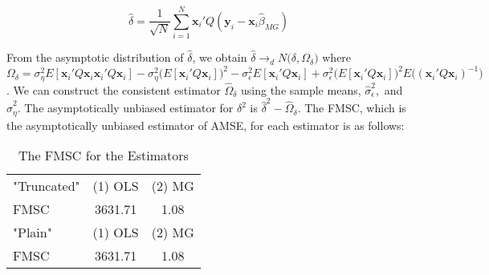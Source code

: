 \[
\widehat{\delta} = \frac{1}{\sqrt{N}} \sum_{i=1}^N \mathbf{x}_i'Q(\mathbf{y}_i - \mathbf{x}_i \widehat{\beta}_{MG})
\]

From the asymptotic distribution of $\widehat{\delta}$, we obtain $\widehat{\delta} \rightarrow_d N\big(\delta , \Omega_\delta\big)$ where $\Omega_\delta = \sigma_\eta^2 E[\mathbf{x}_i'Q \mathbf{x}_i \mathbf{x}_i'Q\mathbf{x}_i] - \sigma_\eta^2 \big(E[\mathbf{x}_i'Q\mathbf{x}_i]\big)^2 - \sigma_\epsilon^2 E[\mathbf{x}_i'Q\mathbf{x}_i] + \sigma_\epsilon^2 \big(E[\mathbf{x}_i'Q\mathbf{x}_i]\big)^2 E\big((\mathbf{x}_i'Q\mathbf{x}_i)^{-1}\big)$. We can construct the consistent estimator $\widehat{\Omega}_\delta$ using the sample means, $\widehat{\sigma}_\epsilon^2,$ and $\widehat{\sigma}_\eta^2$. The asymptotically unbiased estimator for $\delta^2$ is $\widehat{\delta}^2 - \widehat{\Omega}_\delta$. The FMSC, which is the asymptotically unbiased estimator of AMSE, for each estimator is as follows:

\begin{table}[htbp]\centering
\caption{The FMSC for the Estimators}
\begin{tabular}{l  c c  }
\hline
\hline
"Truncated"& (1) OLS & (2) MG\\ 
FMSC &  3631.71 & 1.08\\
\hline
"Plain"& (1) OLS & (2) MG\\ 
FMSC &  3631.71 & 1.08\\
\hline
\hline
\end{tabular}
\end{table}




